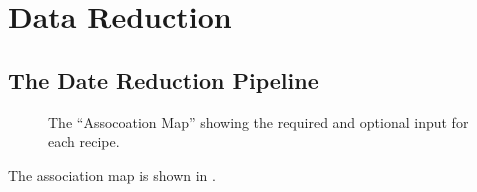 \section{Data Reduction}
\label{sec:datareduction}


\subsection{The \instrument{} Date Reduction Pipeline}
\label{sec:datareduction-pipeline}

\begin{figure}[!tb]
  \begin{center}
  \end{center}
  \caption{
    \label{fig:association-map}
    The \instrument{} ``Assocoation Map'' showing the required and optional
    input for each recipe.}
\end{figure}

The \instrument{} association map is shown in .
